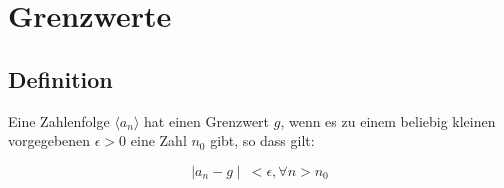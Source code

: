 \section{Grenzwerte}



\subsection{Definition}

Eine Zahlenfolge \( \langle a_n \rangle \) hat einen Grenzwert \(g\),
wenn es zu einem beliebig kleinen vorgegebenen \(\epsilon > 0\)
eine Zahl \(n_0\) gibt, so dass gilt:

\[
	\mid a_n - g \mid\ < \epsilon, \forall n > n_0
\]


